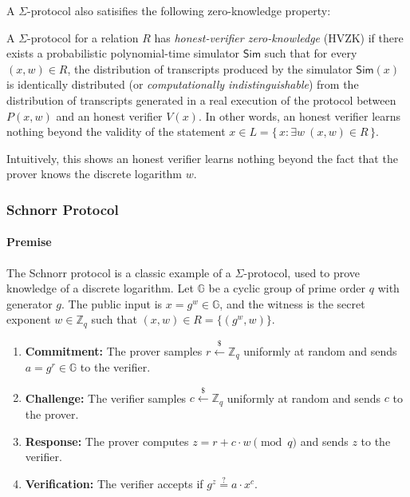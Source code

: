 \noindent A $\Sigma$-protocol also satisifies the following zero-knowledge property:

\begin{definition}
  A $\Sigma$-protocol for a relation $R$ has \emph{honest-verifier zero-knowledge} (HVZK) 
  if there exists a probabilistic polynomial-time simulator $\mathsf{Sim}$ such that for 
  every $(x,w) \in R$, the distribution of transcripts produced by the simulator
  $\mathsf{Sim}(x)$ is identically distributed (or \emph{computationally indistinguishable}) from the distribution 
  of transcripts generated in a real execution of the protocol between $P(x,w)$ and an 
  honest verifier $V(x)$. In other words, an honest verifier learns nothing beyond the 
  validity of the statement $x \in L = \{\,x : \exists w \ (x,w) \in R\,\}$.
\end{definition}

\begin{remark}
  Intuitively, this shows an honest verifier learns nothing beyond the fact that 
  the prover knows the discrete logarithm $w$.
\end{remark}

\subsubsection{Schnorr Protocol}

\paragraph{Premise}
The Schnorr protocol is a classic example of a $\Sigma$-protocol, used to prove knowledge 
of a discrete logarithm. Let $\mathbb{G}$ be a cyclic group of prime order $q$ with generator $g$. 
The public input is $x = g^w \in \mathbb{G}$, and the witness is the secret exponent 
$w \in \mathbb{Z}_q$ such that $(x,w) \in R = \{(g^w, w)\}$.

\myspace

\begin{protocol}
  \begin{enumerate}
    \item \textbf{Commitment:} The prover samples $r \stackrel{\$}{\leftarrow} \mathbb{Z}_q$ uniformly at random 
    and sends $a = g^r \in \mathbb{G}$ to the verifier.
    \item \textbf{Challenge:} The verifier samples $c \stackrel{\$}{\leftarrow} \mathbb{Z}_q$ uniformly at random 
    and sends $c$ to the prover.
    \item \textbf{Response:} The prover computes $z = r + c \cdot w \pmod{q}$ and sends $z$ to the verifier.
    \item \textbf{Verification:} The verifier accepts if 
    $
      g^z \stackrel{?}{=} a \cdot x^c.
    $
  \end{enumerate}
  \end{protocol}

